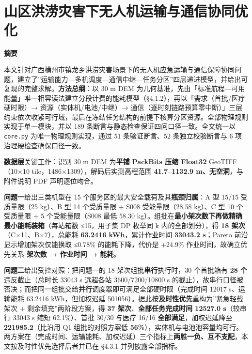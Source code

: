 \documentclass[
  10.5pt,
]{article}
\author{}
\date{}
\begin{document}
\section{山区洪涝灾害下无人机运输与通信协同优化}\label{ux5c71ux533aux6d2aux6d9dux707eux5bb3ux4e0bux65e0ux4ebaux673aux8fd0ux8f93ux4e0eux901aux4fe1ux534fux540cux4f18ux5316}

\textbf{摘要}

本文针对广西横州市镇龙乡洪涝灾害场景下的无人机应急运输与通信保障协同问题，建立了''运输能力---多机调度---通信中继---任务分区''四层递进模型，并给出可复现的完整求解。\textbf{方法总纲}：以
30 m DEM
为几何基准，先由「标准航程---可用能量」唯一相容读法建立分段计费的能耗模型（§4.1.2），再以「需求（首批/医疗硬时限）→
资源（实体机/电池/中继）→
通信（逐时刻链路预算零中断）」三层约束依次收紧可行域，最后在冻结任务结构的前提下核算分区资源。全部物理规则实现于单一模块，并以
189 条断言与静态检查保证四问口径一致。全文统一以 \texttt{core.py}
为唯一物理规则实现，通过 51 条验证断言、52 条独立校验断言与 6
项治理硬检查确保口径一致。

\textbf{数据层}关键工作：识别 30 m DEM 为\textbf{平铺 PackBits 压缩
Float32} GeoTIFF（10×10 tile，1486×1309），解码后实测高程范围
\textbf{41.7--1132.9 m、无空洞}，与附件说明 PDF 声明逐位吻合。

\textbf{问题一}给出三类机型在 15
个服务区的最大安全载荷及其\textbf{瓶颈归属}：A 型 15/15 受质量限（25
kg）、B 型 14 个受质量限 + S008 受能量限（28.58 kg）、C 型 10 个受质量限
+ 5 个受能量限（S008 最低 58.30
kg）。组批在\textbf{最小架次数下再做精确最小能耗装箱}（每站箱数
≤15，用子集 DP 枚举同 k 内的全部划分），得 \textbf{18
架次}（C×11、B×7），总能耗 \textbf{63.2416 kWh}，累计作业时间
\textbf{33043.2 s}；Pareto 前沿显示增加架次仅能换取 ≤0.78\%
的能耗下降，代价是 +24.9\% 作业时间，故确立优先关系 \textbf{架次数 →
作业时间 → 能耗}。

\textbf{问题二}给出受控对照：把问题一的 18
架次组批\textbf{串行}执行时，30 个首批箱有 \textbf{28
个}违反截止（总时长 33043 s 远超各站 3600/7200/10800 s
的截止），故串行口径被否决；而把同一组批交给\textbf{并行}调度器即可满足全部硬时限（完成时间
12017 s、运输能耗 63.2416 kWh，但加权迟延
501056）。据此按\textbf{及时性优先}重构为''紧急轻载架次 +
剩余填充''两阶段方案，得 \textbf{37 架次}、\textbf{全部任务完成时间
12527.0 s}（较串行 33043 s 缩短 62.1\%）、首批 30/30 与医疗 16/16
\textbf{全部满足}，加权迟延降至 \textbf{221985.2}（比沿用 Q1
组批的对照方案低
\textbf{56\%}），实体机与电池池容量均可行。两方案在（完成时间、运输能耗、加权迟延）三个指标上\textbf{两胜一负、互不支配}，本文按及时性优先选择后者并已在
§4.3.1 并列披露全部指标。
\end{document}
